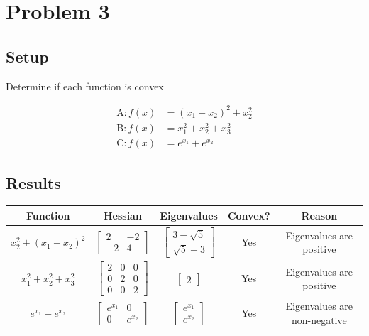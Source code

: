 \documentclass{article}%
\begin{document}
%
\section*{Problem 3}%
\label{sec:Problem3}%
\subsection*{Setup}%
\label{subsec:Setup}%
Determine if each function is convex%
\par%
\begin{align*}%
\text{A}: f(x) &= (x_1-x_2)^2 + x_2^2 \\%
\text{B}: f(x) &= x_1^2 + x_2^2+x_3^2 \\%
\text{C}: f(x) &= e^{x_1}+e^{x_2}%
\end{align*}

%
\subsection*{Results}%
\label{subsec:Results}%
\begin{table}[H]%
\centering%
\begin{tabular}{c|c|c|c|c}%
\hline%
Function&Hessian&Eigenvalues&Convex?&Reason\\%
\hline%
$x_{2}^{2} + \left(x_{1} - x_{2}\right)^{2}$&$\left[\begin{matrix}2 & -2\\-2 & 4\end{matrix}\right]$&$\left[\begin{matrix}3 - \sqrt{5}\\\sqrt{5} + 3\end{matrix}\right]$&Yes&Eigenvalues are positive\\%
\hline%
$x_{1}^{2} + x_{2}^{2} + x_{3}^{2}$&$\left[\begin{matrix}2 & 0 & 0\\0 & 2 & 0\\0 & 0 & 2\end{matrix}\right]$&$\left[\begin{matrix}2\end{matrix}\right]$&Yes&Eigenvalues are positive\\%
\hline%
$e^{x_{1}} + e^{x_{2}}$&$\left[\begin{matrix}e^{x_{1}} & 0\\0 & e^{x_{2}}\end{matrix}\right]$&$\left[\begin{matrix}e^{x_{1}}\\e^{x_{2}}\end{matrix}\right]$&Yes&Eigenvalues are non{-}negative\\%
\hline%
\end{tabular}%
\end{table}
\end{document}
